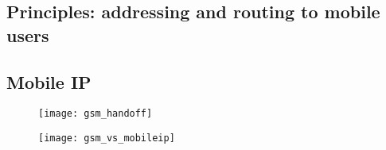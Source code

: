 \subsection{Principles: addressing and routing to mobile users}

\subsection{Mobile IP}

\begin{figure}[H]
  \centering
  \texttt{[image: gsm\_handoff]}
\end{figure}



\begin{figure}[H]
  \centering
  \texttt{[image: gsm\_vs\_mobileip]}
\end{figure}





